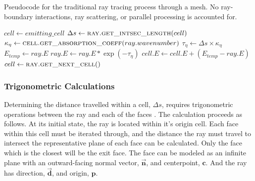 \begin{algorithm}
    \caption{Pseudocode for the traditional ray tracing process through a mesh. No ray-boundary interactions, ray scattering, or parallel processing is accounted for.}
    \label{alg:traditional_raytracing}
    \begin{algorithmic}[1] %

                    \State {} 
                    \State $cell\gets emitting\_cell$
                        \State $\Delta{s} \gets \Call{ray.get\_intsec\_length}{cell}$
                        \State $\kappa{}_\eta{} \gets \Call{cell.get\_absorption\_coeff}{ray.wavenumber}$
                        \State $\tau_\eta{} \gets \Delta{s}\times{\kappa{}_\eta{}}$ 
                        \State $E_{temp} \gets ray.E$
                        \State $ray.E \gets ray.E * \exp{(-\tau_\eta)}$
                        \State $cell.E \gets cell.E + (E_{temp} - ray.E)$
                        \State $cell \gets \Call{ray.get\_next\_cell}{ }$
                    \EndWhile
                \EndFor
            \EndFor
        \EndProcedure
        
    \end{algorithmic}
\end{algorithm}

\subsubsection{Trigonometric Calculations}
Determining the distance travelled within a cell, $\Delta{s}$, requires trigonometric operations between the ray and each of the faces \cite{Zeeb2001AnGeometries}.
The calculation proceeds as follows. At its initial state, the ray is located within it's origin cell. Each face within this cell must be iterated through, and the distance the ray must travel to intersect the representative plane of each face can be calculated. 
Only the face which is the closest will be the exit face. 
The face can be modeled as an infinite plane with an outward-facing normal vector, $\Vec{\textbf{n}}$, and centerpoint, $\textbf{c}$.
And the ray has direction, $\Vec{\textbf{d}}$, and origin, $\textbf{p}$. 


